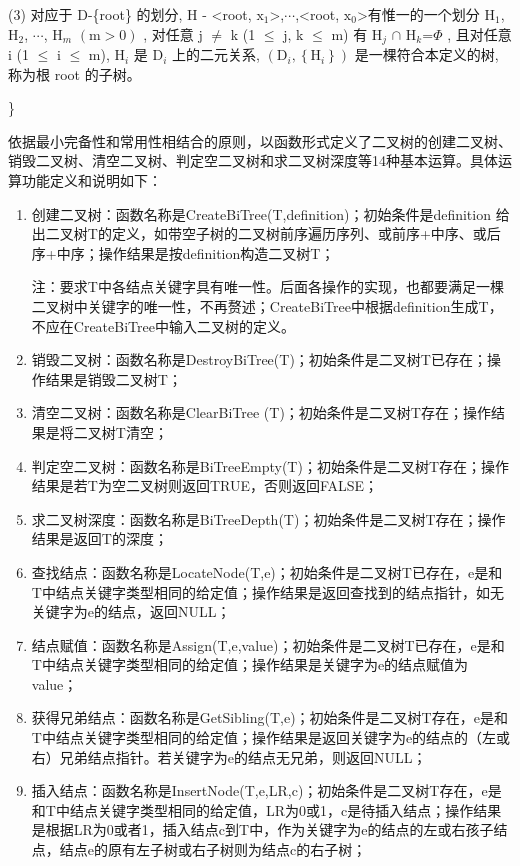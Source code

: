 \documentclass[supercite]{Experimental_Report}
\newcommand{\whiteding}[1]{\ding{\numexpr171+#1\relax}}
\theoremstyle{definition}
\begin{document}
(3) 对应于 D-\{root\}  的划分,  H - <root, $\mathrm{x}_{1}$>,$\cdots$,<root, $\mathrm{x}_{0}$>有惟一的一个划分  $\mathrm{H}_{1}$,$\mathrm{H}_{2}$, $\cdots$, $\mathrm{H}_{m}$ $(\mathrm{m}>0)$ , 对任意  j $\neq$ k (1 $\leq$ j, k $\leq$ m)  有  $\mathrm{H}_{j}$ $\cap$ $\mathrm{H}_{k}$=$\Phi$ , 且对任意  i (1 $\leq$ i $\leq$ m), $\mathrm{H}_{i}$  是  $\mathrm{D}_{i}$  上的二元关系,  $\left(\mathrm{D}_{i},\left\{\mathrm{H}_{i}\right\}\right)$  是一棵符合本定义的树, 称为根 root 的子树。

\}

依据最小完备性和常用性相结合的原则，以函数形式定义了二叉树的创建二叉树、销毁二叉树、清空二叉树、判定空二叉树和求二叉树深度等14种基本运算。具体运算功能定义和说明如下：

\begin{enumerate}
    \item 创建二叉树：函数名称是CreateBiTree(T,definition)；初始条件是definition 给出二叉树T的定义，如带空子树的二叉树前序遍历序列、或前序+中序、或后序+中序；操作结果是按definition构造二叉树T；

注：\whiteding{1}要求T中各结点关键字具有唯一性。后面各操作的实现，也都要满足一棵二叉树中关键字的唯一性，不再赘述；\whiteding{2}CreateBiTree中根据definition生成T，不应在CreateBiTree中输入二叉树的定义。
    \item 销毁二叉树：函数名称是DestroyBiTree(T)；初始条件是二叉树T已存在；操作结果是销毁二叉树T；
    \item 清空二叉树：函数名称是ClearBiTree (T)；初始条件是二叉树T存在；操作结果是将二叉树T清空；
    \item 判定空二叉树：函数名称是BiTreeEmpty(T)；初始条件是二叉树T存在；操作结果是若T为空二叉树则返回TRUE，否则返回FALSE；
    \item 求二叉树深度：函数名称是BiTreeDepth(T)；初始条件是二叉树T存在；操作结果是返回T的深度；
    \item 查找结点：函数名称是LocateNode(T,e)；初始条件是二叉树T已存在，e是和T中结点关键字类型相同的给定值；操作结果是返回查找到的结点指针，如无关键字为e的结点，返回NULL；
    \item 结点赋值：函数名称是Assign(T,e,value)；初始条件是二叉树T已存在，e是和T中结点关键字类型相同的给定值；操作结果是关键字为e的结点赋值为value；
	\item 获得兄弟结点：函数名称是GetSibling(T,e)；初始条件是二叉树T存在，e是和T中结点关键字类型相同的给定值；操作结果是返回关键字为e的结点的（左或右）兄弟结点指针。若关键字为e的结点无兄弟，则返回NULL；
	\item 插入结点：函数名称是InsertNode(T,e,LR,c)；初始条件是二叉树T存在，e是和T中结点关键字类型相同的给定值，LR为0或1，c是待插入结点；操作结果是根据LR为0或者1，插入结点c到T中，作为关键字为e的结点的左或右孩子结点，结点e的原有左子树或右子树则为结点c的右子树；


\end{enumerate}
\end{document}
